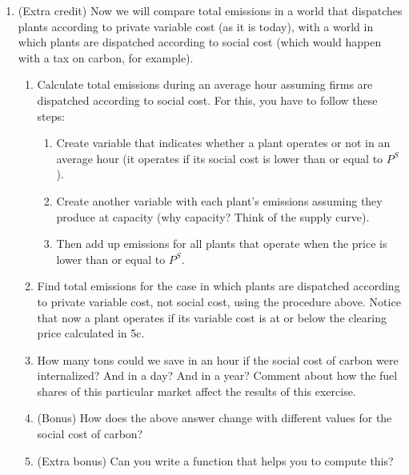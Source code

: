 \documentclass[11pt]{article}
\begin{document}
\begin{enumerate}
	\item (Extra credit) Now we will compare total emissions in a world that dispatches plants according to private variable cost (as it is today), with a world in which plants are dispatched according to social cost (which would happen with a tax on carbon, for example).
	\begin{enumerate}
	\item Calculate total emissions during an average hour assuming firms are dispatched according to social cost. For this, you have to follow these steps:
		\begin{enumerate}
		\item Create variable that indicates whether a plant operates or not in an average hour (it operates if its social cost is lower than or equal to $P^S$). 
		\item Create another variable with each plant's emissions assuming they produce at capacity (why capacity? Think of the supply curve). 
		\item Then add up emissions for all plants that operate when the price is lower than or equal to $P^S$.
		\end{enumerate}
	\item Find total emissions for the case in which plants are dispatched according to private variable cost, not social cost, using the procedure above. Notice that now a plant operates if its variable cost is at or below the clearing price calculated in 5c.
	\item How many tons could we save in an hour if the social cost of carbon were internalized? And in a day? And in a year? Comment about how the fuel shares of this particular market affect the results of this exercise.
	\item (Bonus) How does the above answer change with different values for the social cost of carbon? 
	\item (Extra bonus) Can you write a function that helps you to compute this?
		\end{enumerate}



	
\end{enumerate}
\end{document}

